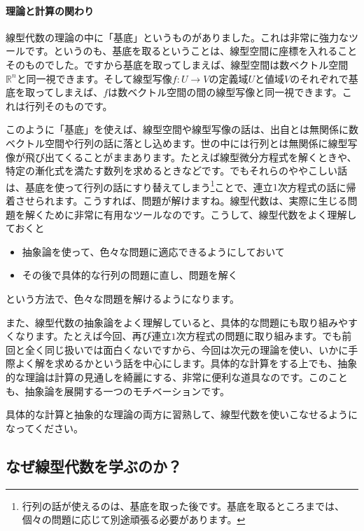 \paragraph{理論と計算の関わり}

線型代数の理論の中に「基底」というものがありました。これは非常に強力なツールです。というのも、基底を取るということは、線型空間に座標を入れることそのものでした。ですから基底を取ってしまえば、線型空間は数ベクトル空間$\mathbb{R}^n$と同一視できます。そして線型写像$f\colon U\rightarrow V$の定義域$U$と値域$V$のそれぞれで基底を取ってしまえば、$f$は数ベクトル空間の間の線型写像と同一視できます。これは行列そのものです。

このように「基底」を使えば、線型空間や線型写像の話は、出自とは無関係に数ベクトル空間や行列の話に落とし込めます。世の中には行列とは無関係に線型写像が飛び出てくることがままあります。たとえば線型微分方程式を解くときや、特定の漸化式を満たす数列を求めるときなどです。でもそれらのややこしい話は、基底を使って行列の話にすり替えてしまう\footnote{行列の話が使えるのは、基底を取った後です。基底を取るところまでは、個々の問題に応じて別途頑張る必要があります。}ことで、連立$1$次方程式の話に帰着させられます。こうすれば、問題が解けますね。線型代数は、実際に生じる問題を解くために非常に有用なツールなのです。こうして、線型代数をよく理解しておくと
\begin{itemize}
\item 抽象論を使って、色々な問題に適応できるようにしておいて
\item その後で具体的な行列の問題に直し、問題を解く
\end{itemize}
という方法で、色々な問題を解けるようになります。

また、線型代数の抽象論をよく理解していると、具体的な問題にも取り組みやすくなります。たとえば今回、再び連立$1$次方程式の問題に取り組みます。でも前回と全く同じ扱いでは面白くないですから、今回は次元の理論を使い、いかに手際よく解を求めるかという話を中心にします。具体的な計算をする上でも、抽象的な理論は計算の見通しを綺麗にする、非常に便利な道具なのです。このことも、抽象論を展開する一つのモチベーションです。

具体的な計算と抽象的な理論の両方に習熟して、線型代数を使いこなせるようになってください。


\subsection{なぜ線型代数を学ぶのか？}

